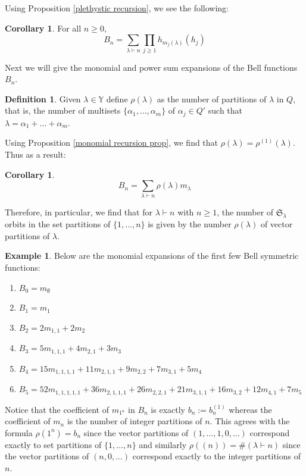 \documentclass[12pt,reqno]{amsart}
\theoremstyle{definition}
\newtheorem{cor}[thm]{Corollary}
\newtheorem{defn}[thm]{Definition}
\newtheorem{example}{Example}
\begin{document}
Using Proposition \ref{plethystic recursion}, we see the following:

\begin{cor}
For all $n\geq 0,$
    $$B_n = \sum_{\lambda \vdash n} \prod_{j \geq 1} h_{m_j(\lambda)}(h_j)$$
\end{cor}

Next we will give the monomial and power sum expansions of the Bell functions $B_n.$

\begin{defn}
     Given $\lambda \in \mathbb{Y}$ define $\rho(\lambda)$ as the number of partitions of $\lambda$ in $Q$, that is, 
    the number of multisets $\{\alpha_1,\ldots , \alpha_m\}$ of $\alpha_j \in Q'$ such that $\lambda = \alpha_1+\ldots + \alpha_m.$
\end{defn}

Using Proposition \ref{monomial recursion prop}, we find that $\rho(\lambda) = \rho^{(1)}(\lambda).$ Thus as a result:

\begin{cor}
    $$B_n = \sum_{\lambda \vdash n} \rho(\lambda) m_{\lambda}$$
\end{cor}

Therefore, in particular, we find that for $\lambda \vdash n$ with $n \geq 1$, the number of $\mathfrak{S}_{\lambda}$ orbits in the set partitions of $\{1,\ldots, n\}$ is given by the number $\rho(\lambda)$ of vector partitions of $\lambda.$


\begin{example}
Below are the monomial expansions of the first few Bell symmetric functions:
    \begin{enumerate}
        \item $B_0 = m_{\emptyset} $
        \item $B_1 = m_{1}$
        \item $B_2 = 2m_{1,1} +2m_2$
        \item $B_3 = 5m_{1, 1, 1} + 4m_{2, 1} + 3m_{3}$
        \item $B_4 = 15m_{1, 1, 1, 1} + 11m_{2, 1, 1} + 9m_{2, 2} + 7m_{3, 1} + 5m_{4}$
        \item $B_5 = 52m_{1, 1, 1, 1, 1} + 36m_{2, 1, 1, 1} + 26m_{2, 2, 1} + 21m_{3, 1, 1} + 16m_{3, 2} + 12m_{4, 1} + 7m_{5}$
    \end{enumerate}
    Notice that the coefficient of $m_{1^n}$ in $B_n$ is exactly $b_n:=b_n^{(1)}$ whereas the coefficient of $m_n$ is the number of integer partitions of $n.$ This agrees with the formula $\rho(1^n) = b_n$ since the vector partitions of $(1,\ldots,1,0,\ldots)$ correspond exactly to set partitions of $\{1,\ldots,n\}$ and similarly $\rho( (n) ) = \#(\lambda \vdash n)$ since the vector partitions of $ (n,0,\ldots)$ correspond exactly to the integer partitions of $n.$
\end{example}
\end{document}
